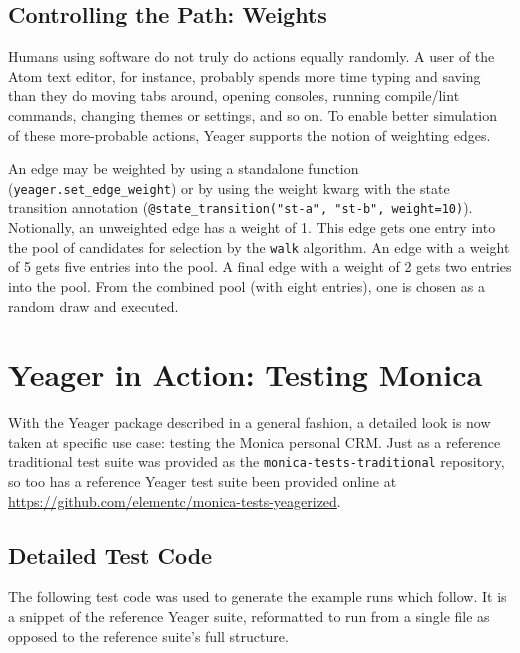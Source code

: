 \subsection{Controlling the Path: Weights}
Humans using software do not truly do actions equally randomly. A user of the Atom text editor, for instance, probably spends more time typing and saving than they do moving tabs around, opening consoles, running compile/lint commands, changing themes or settings, and so on. To enable better simulation of these more-probable actions, Yeager supports the notion of weighting edges.

An edge may be weighted by using a standalone function
\\(\texttt{yeager.set\_edge\_weight}) or by using the weight kwarg with the state transition annotation (\texttt{@state\_transition("st-a", "st-b", weight=10)}). Notionally, an unweighted edge has a weight of 1. This edge gets one entry into the pool of candidates for selection by the \texttt{walk} algorithm. An edge with a weight of 5 gets five entries into the pool. A final edge with a weight of 2 gets two entries into the pool. From the combined pool (with eight entries), one is chosen as a random draw and executed.

\section{Yeager in Action: Testing Monica}
With the Yeager package described in a general fashion, a detailed look is now taken at specific use case: testing the Monica personal CRM. Just as a reference traditional test suite was provided as the \texttt{monica-tests-traditional} repository, so too has a reference Yeager test suite been provided online at \url{https://github.com/elementc/monica-tests-yeagerized}.

\subsection{Detailed Test Code}

The following test code was used to generate the example runs which follow. It is a snippet of the reference Yeager suite, reformatted to run from a single file as opposed to the reference suite's full structure.

